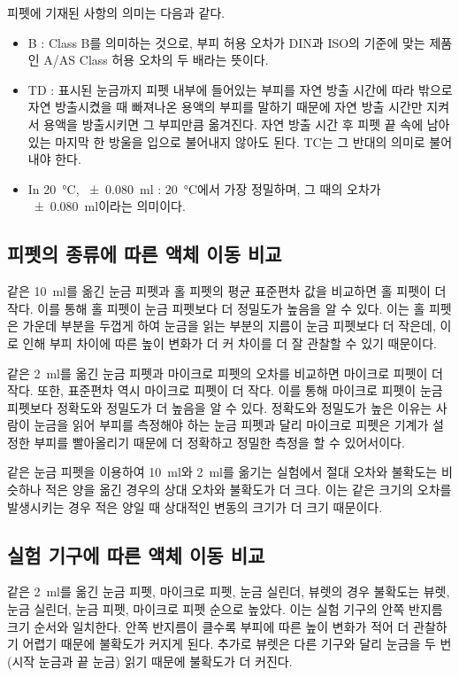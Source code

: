 \documentclass{GSHS-chemexp}
\begin{document}
	피펫에 기재된 사항의 의미는 다음과 같다.
	\begin{itemize}
		\item B : Class B를 의미하는 것으로,
		부피 허용 오차가 DIN과 ISO의 기준에 맞는 제품인
		A/AS Class 허용 오차의 두 배라는 뜻이다.
		\item TD : 표시된 눈금까지 피펫 내부에 들어있는 부피를
		자연 방출 시간에 따라 밖으로 자연 방출시켰을 때
		빠져나온 용액의 부피를 말하기 때문에
		자연 방출 시간만 지켜서 용액을 방출시키면 그 부피만큼 옮겨진다.
		자연 방출 시간 후 피펫 끝 속에 남아있는 마지막 한 방울을
		입으로 불어내지 않아도 된다. TC는 그 반대의 의미로 불어내야 한다.
		\item In \SI{20}{\degreeCelsius}, \SI{+-0.080}{\milli\litre} :
		\SI{20}{\degreeCelsius}에서 가장 정밀하며,
		그 때의 오차가 \SI{+-0.080}{\milli\litre}이라는 의미이다.
	\end{itemize}
	
	\subsection{피펫의 종류에 따른 액체 이동 비교}
	같은 \SI{10}{\milli\litre}를 옮긴 눈금 피펫과 홀 피펫의
	평균 표준편차 값을 비교하면 홀 피펫이 더 작다.
	이를 통해 홀 피펫이 눈금 피펫보다 더 정밀도가 높음을 알 수 있다.
	이는 홀 피펫은 가운데 부분을 두껍게 하여 눈금을 읽는 부분의 지름이
	눈금 피펫보다 더 작은데, 이로 인해 부피 차이에 따른 높이 변화가 더 커
	차이를 더 잘 관찰할 수 있기 때문이다.
	
	같은 \SI{2}{\milli\litre}를 옮긴 눈금 피펫과 마이크로 피펫의
	오차를 비교하면 마이크로 피펫이 더 작다.
	또한, 표준편차 역시 마이크로 피펫이 더 작다.
	이를 통해 마이크로 피펫이 눈금 피펫보다
	정확도와 정밀도가 더 높음을 알 수 있다.
	정확도와 정밀도가 높은 이유는 사람이 눈금을 읽어 부피를 측정해야 하는
	눈금 피펫과 달리 마이크로 피펫은 기계가 설정한 부피를 빨아올리기 때문에
	더 정확하고 정밀한 측정을 할 수 있어서이다.
	
	같은 눈금 피펫을 이용하여 \SI{10}{\milli\litre}와 \SI{2}{\milli\litre}를
	옮기는 실험에서 절대 오차와 불확도는 비슷하나 적은 양을 옮긴 경우의
	상대 오차와 불확도가 더 크다. 이는 같은 크기의 오차를 발생시키는 경우
	적은 양일 때 상대적인 변동의 크기가 더 크기 때문이다.
	
	\subsection{실험 기구에 따른 액체 이동 비교}
	같은 \SI{2}{\milli\litre}를 옮긴 눈금 피펫, 마이크로 피펫,
	눈금 실린더, 뷰렛의 경우 불확도는 뷰렛, 눈금 실린더, 눈금 피펫,
	마이크로 피펫 순으로 높았다. 이는 실험 기구의 안쪽 반지름
	크기 순서와 일치한다. 안쪽 반지름이 클수록 부피에 따른 높이 변화가
	적어 더 관찰하기 어렵기 때문에 불확도가 커지게 된다.
	추가로 뷰렛은 다른 기구와 달리 눈금을 두 번(시작 눈금과 끝 눈금)
	읽기 때문에 불확도가 더 커진다.
	
\end{document}
